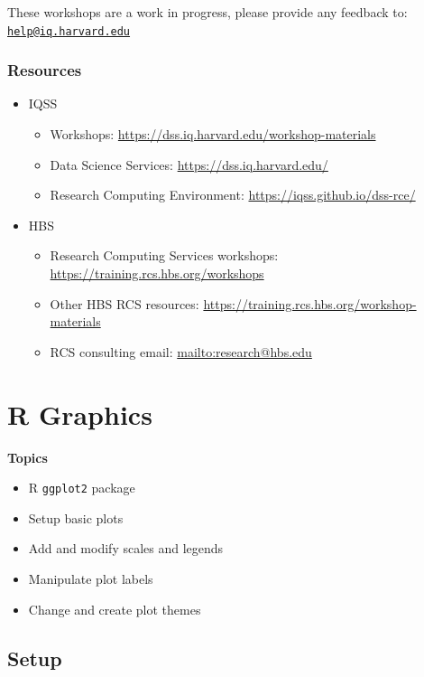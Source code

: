 \documentclass[]{book}
\providecommand{\tightlist}{%
  \setlength{\itemsep}{0pt}\setlength{\parskip}{0pt}}
\begin{document}
These workshops are a work in progress, please provide any feedback to:
\href{mailto:help@iq.harvard.edu}{\nolinkurl{help@iq.harvard.edu}}

\subsection{Resources}\label{resources-2}

\begin{itemize}
\tightlist
\item
  IQSS

  \begin{itemize}
  \tightlist
  \item
    Workshops: \url{https://dss.iq.harvard.edu/workshop-materials}
  \item
    Data Science Services: \url{https://dss.iq.harvard.edu/}
  \item
    Research Computing Environment:
    \url{https://iqss.github.io/dss-rce/}
  \end{itemize}
\item
  HBS

  \begin{itemize}
  \tightlist
  \item
    Research Computing Services workshops:
    \url{https://training.rcs.hbs.org/workshops}
  \item
    Other HBS RCS resources:
    \url{https://training.rcs.hbs.org/workshop-materials}
  \item
    RCS consulting email: \url{mailto:research@hbs.edu}
  \end{itemize}
\end{itemize}

\chapter{R Graphics}\label{r-graphics}

\textbf{Topics}

\begin{itemize}
\tightlist
\item
  R \texttt{ggplot2} package
\item
  Setup basic plots
\item
  Add and modify scales and legends
\item
  Manipulate plot labels
\item
  Change and create plot themes
\end{itemize}

\section{Setup}\label{setup-2}
\end{document}
